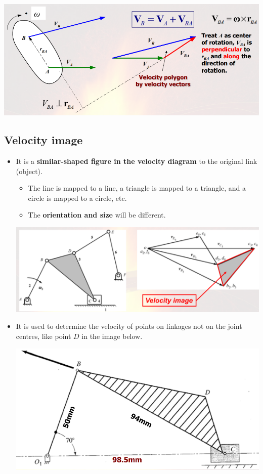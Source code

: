 \documentclass[11pt]{article}
\begin{document}
\begin{center}
\includegraphics[width=.9\linewidth]{./images/relative-velocity-of-rigid-body.png}
\end{center}

 \newpage
\subsection{Velocity image}
\label{sec:org23deeec}
\begin{itemize}
\item It is a \textbf{similar-shaped figure in the velocity diagram} to the original link (object).
\begin{itemize}
\item The line is mapped to a line, a triangle is mapped to a triangle, and a circle is mapped to a circle, etc.
\item The \textbf{orientation and size} will be different.
\end{itemize}
\begin{center}
\includegraphics[width=.9\linewidth]{./images/velocity-image-comparison.png}
\end{center}

\item It is used to determine the velocity of points on linkages not on the joint centres, like point \(D\) in the image below.
\begin{center}
\includegraphics[width=.9\linewidth]{./images/velocity-image-diagram.png}
\end{center}
\end{itemize}
\end{document}
